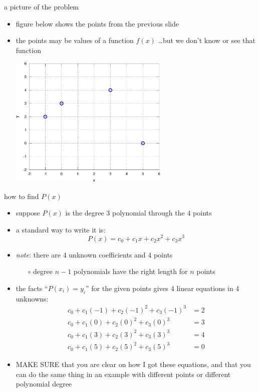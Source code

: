 \documentclass[10pt,hyperref]{beamer}
\newcommand{\MS}{\alert{MAKE SURE}\xspace}
\begin{document}
\begin{frame}{a picture of the problem}

\begin{itemize}
\item figure below shows the points from the previous slide
\item the points may be values of a function $f(x)$ \dots but we don't know or see that function

\medskip
  \begin{center}
  \includegraphics[width=0.6\textwidth]{ex1}
  \end{center}
\end{itemize}
\end{frame}


\begin{frame}{how to find $P(x)$}

\begin{itemize}
\item suppose $P(x)$ is the degree 3 polynomial through the 4 points
\item a standard way to write it is:
	$$P(x) = c_0 + c_1 x + c_2 x^2 + c_3 x^3$$
\item \emph{note}: there are 4 unknown coefficients and 4 points
  \begin{itemize}
  \item[$\circ$] degree $n-1$ polynomials have the right length for $n$ points
  \end{itemize}
\item the facts ``$P(x_i)=y_i$'' for the given points gives 4 linear equations in 4 unknowns:
\begin{align*}
c_0 + c_1 (-1) + c_2 (-1)^2 + c_3 (-1)^3 &= 2 \\
c_0 + c_1 (0) + c_2 (0)^2 + c_3 (0)^3 &= 3 \\
c_0 + c_1 (3) + c_2 (3)^2 + c_3 (3)^3 &= 4 \\
c_0 + c_1 (5) + c_2 (5)^2 + c_3 (5)^3 &= 0
\end{align*}
\item \MS that you are clear on how I got these equations, and that you can do the same thing in an example with different points or different polynomial degree
\end{itemize}
\end{frame}
\end{document}
